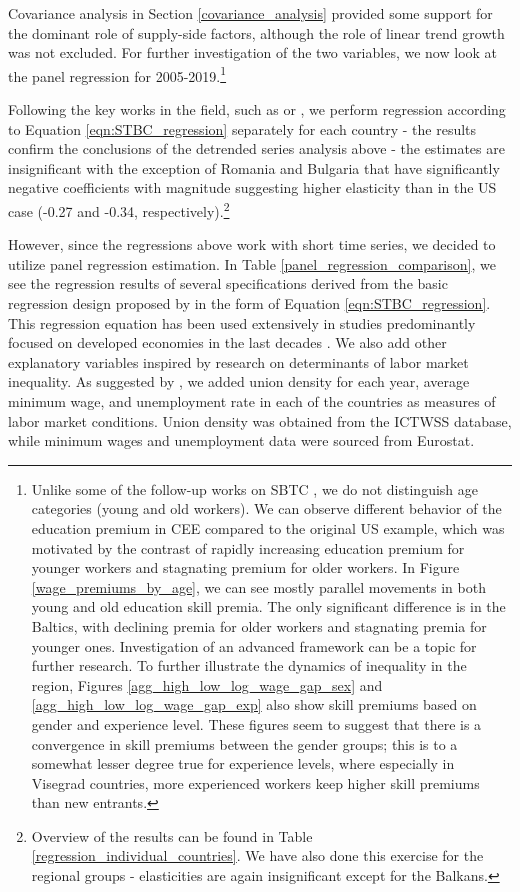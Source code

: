\documentclass[11pt]{article}
\begin{document}
Covariance analysis in Section \ref{covariance_analysis} provided some support for the dominant role of supply-side factors, although the role of linear trend growth was not excluded. For further investigation of the two variables, we now look at the panel regression for 2005-2019.\footnote{Unlike some of the follow-up works on SBTC \citep{card2001can}, we do not distinguish age categories (young and old workers). We can observe different behavior of the education premium in CEE compared to the original US example, which was motivated by the contrast of rapidly increasing education premium for younger workers and stagnating premium for older workers. In Figure \ref{wage_premiums_by_age}, we can see mostly parallel movements in both young and old education skill premia. The only significant difference is in the Baltics, with declining premia for older workers and stagnating premia for younger ones. Investigation of an advanced framework can be a topic for further research. To further illustrate the dynamics of inequality in the region, Figures \ref{agg_high_low_log_wage_gap_sex} and \ref{agg_high_low_log_wage_gap_exp} also show skill premiums based on gender and experience level. These figures seem to suggest that there is a convergence in skill premiums between the gender groups; this is to a somewhat lesser degree true for experience levels, where especially in Visegrad countries, more experienced workers keep higher skill premiums than new entrants.} 

Following the key works in the field, such as \citet{katz1992changes} or \citet{acemoglu2012does}, we perform regression according to Equation \ref{eqn:STBC_regression} separately for each country - the results confirm the conclusions of the detrended series analysis above - the estimates are insignificant with the exception of Romania and Bulgaria that have significantly negative coefficients with magnitude suggesting higher elasticity than in the US case (-0.27 and -0.34, respectively).\footnote{Overview of the results can be found in Table \ref{regression_individual_countries}. We have also done this exercise for the regional groups - elasticities are again insignificant except for the Balkans.}

However, since the regressions above work with short time series, we decided to utilize panel regression estimation. In Table \ref{panel_regression_comparison}, we see the regression results of several specifications derived from the basic regression design proposed by \citet{katz1992changes} in the form of Equation \ref{eqn:STBC_regression}. This regression equation has been used extensively in studies predominantly focused on developed economies in the last decades \citep{havranek2020elasticity}. We also add other explanatory variables inspired by research on determinants of labor market inequality. As suggested by \citet{farber2021unions}, we added union density for each year, average minimum wage, and unemployment rate in each of the countries as measures of labor market conditions. Union density was obtained from the ICTWSS database, while minimum wages and unemployment data were sourced from Eurostat.
\end{document}

